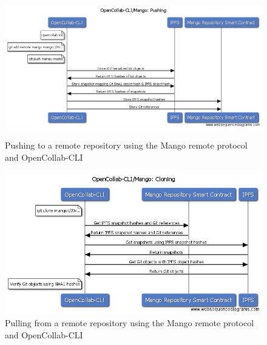\begin{figure}[p!]
  \centering
  \includegraphics[width=\linewidth,keepaspectratio]{figures/OpenCollab-CLI-Mango-Pushing.png}
  \caption{Pushing to a remote repository using the Mango remote protocol and OpenCollab-CLI}

  \vspace*{\floatsep}

  \includegraphics[width=\linewidth,keepaspectratio]{figures/OpenCollab-CLI-Mango-Cloning.png}
  \caption{Pulling from a remote repository using the Mango remote protocol and OpenCollab-CLI}
\end{figure}

